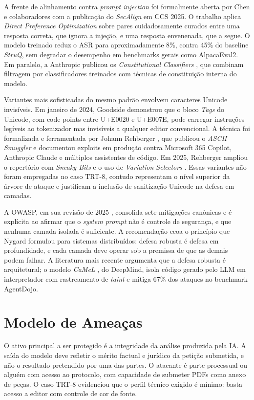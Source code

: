 \documentclass[11pt,a4paper]{article}
\begin{document}
A frente de alinhamento contra \emph{prompt injection} foi formalmente aberta por Chen e colaboradores \cite{chen2025} com a publicação do \emph{SecAlign} em CCS 2025. O trabalho aplica \emph{Direct Preference Optimization} \cite{rafailov2023} sobre pares cuidadosamente curados entre uma resposta correta, que ignora a injeção, e uma resposta envenenada, que a segue. O modelo treinado reduz o ASR para aproximadamente 8\%, contra 45\% do baseline \emph{StruQ}, sem degradar o desempenho em benchmarks gerais como AlpacaEval2. Em paralelo, a Anthropic publicou os \emph{Constitutional Classifiers} \cite{anthropic2025}, que combinam filtragem por classificadores treinados com técnicas de constituição interna do modelo.

Variantes mais sofisticadas do mesmo padrão envolvem caracteres Unicode invisíveis. Em janeiro de 2024, Goodside demonstrou que o bloco \emph{Tags} do Unicode, com code points entre U+E0020 e U+E007E, pode carregar instruções legíveis ao tokenizador mas invisíveis a qualquer editor convencional. A técnica foi formalizada e ferramentada por Johann Rehberger \cite{rehberger2024}, que publicou o \emph{ASCII Smuggler} e documentou exploits em produção contra Microsoft 365 Copilot, Anthropic Claude e múltiplos assistentes de código. Em 2025, Rehberger ampliou o repertório com \emph{Sneaky Bits} e o uso de \emph{Variation Selectors} \cite{rehberger2025}. Essas variantes não foram empregadas no caso TRT-8, contudo representam o nível superior da árvore de ataque e justificam a inclusão de sanitização Unicode na defesa em camadas.

A OWASP, em sua revisão de 2025 \cite{owasp2025}, consolida sete mitigações canônicas e é explícita ao afirmar que o \emph{system prompt} não é controle de segurança, e que nenhuma camada isolada é suficiente. A recomendação ecoa o princípio que Nygard \cite{nygard2018} formulou para sistemas distribuídos: defesa robusta é defesa em profundidade, e cada camada deve operar sob a premissa de que as demais podem falhar. A literatura mais recente argumenta que a defesa robusta é arquitetural; o modelo \emph{CaMeL} \cite{willison2025}, do DeepMind, isola código gerado pelo LLM em interpretador com rastreamento de \emph{taint} e mitiga 67\% dos ataques no benchmark AgentDojo.

\section{Modelo de Ameaças}

O ativo principal a ser protegido é a integridade da análise produzida pela IA. A saída do modelo deve refletir o mérito factual e jurídico da petição submetida, e não o resultado pretendido por uma das partes. O atacante é parte processual ou alguém com acesso ao protocolo, com capacidade de submeter PDFs como anexo de peças. O caso TRT-8 evidenciou que o perfil técnico exigido é mínimo: basta acesso a editor com controle de cor de fonte.
\end{document}
